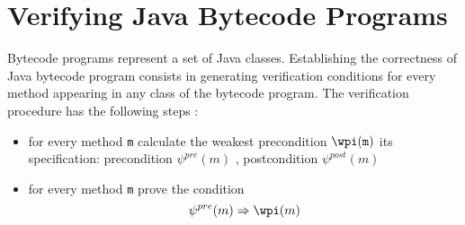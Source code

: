 \section{Verifying Java Bytecode Programs}\label{vcg}
Bytecode programs represent a set of Java classes. Establishing the correctness of Java bytecode program consists in generating verification conditions for every method appearing in any class of the bytecode program.
The verification procedure has the following steps :
\begin{itemize}
\item for every method \texttt{m} calculate the weakest precondition $\wpi(\tt{m})$ its specification:  precondition $\psi^{pre}(m)$ , postcondition $\psi^{post}(m)$
\item  for every method \texttt{m} prove the condition 
$$
\psi^{pre}(m)  \Rightarrow \wpi(m)
$$    
\end{itemize}


